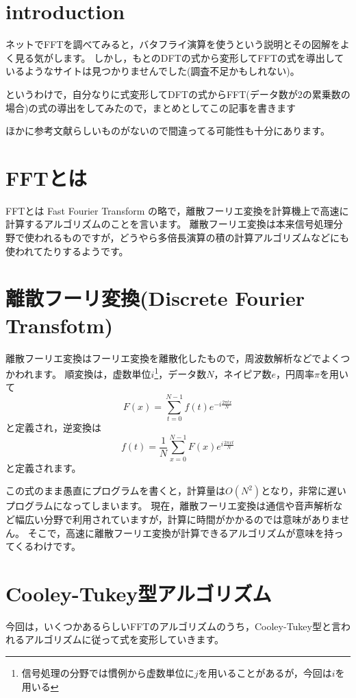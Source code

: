 \documentclass[uplatex, 11pt, a4j, dvipdfmx]{jsarticle}
\begin{document}
\section{introduction}
    ネットでFFTを調べてみると，バタフライ演算を使うという説明とその図解をよく見る気がします。
    しかし，もとのDFTの式から変形してFFTの式を導出しているようなサイトは見つかりませんでした(調査不足かもしれない)。

    というわけで，自分なりに式変形してDFTの式からFFT(データ数が2の累乗数の場合)の式の導出をしてみたので，まとめとしてこの記事を書きます

    ほかに参考文献らしいものがないので間違ってる可能性も十分にあります。

\section{FFTとは}
    FFTとは Fast Fourier Transform の略で，離散フーリエ変換を計算機上で高速に計算するアルゴリズムのことを言います。
    離散フーリエ変換は本来信号処理分野で使われるものですが，どうやら多倍長演算の積の計算アルゴリズムなどにも使われてたりするようです。

\section{離散フーリ変換(Discrete Fourier Transfotm)}
    離散フーリエ変換はフーリエ変換を離散化したもので，周波数解析などでよくつかわれます。
    順変換は，虚数単位$i$\footnote{信号処理の分野では慣例から虚数単位に$j$を用いることがあるが，今回は$i$を用いる}，データ数$N$，ネイピア数$e$，円周率$\pi$を用いて
    \begin{equation}
        F(x) = \sum_{t=0}^{N-1} f(t) e^{-i \frac{2 \pi tx}{N}} \label{eq:dft}
    \end{equation}
    と定義され，逆変換は
    \begin{equation}
        f(t) = \frac{1}{N} \sum_{x=0}^{N-1} F(x) e^{i \frac{2 \pi xt}{N}} \label{eq:idft}
    \end{equation}
    と定義されます。

    この式のまま愚直にプログラムを書くと，計算量は$O(N^2)$となり，非常に遅いプログラムになってしまいます。
    現在，離散フーリエ変換は通信や音声解析など幅広い分野で利用されていますが，計算に時間がかかるのでは意味がありません。
    そこで，高速に離散フーリエ変換が計算できるアルゴリズムが意味を持ってくるわけです。

\section{Cooley-Tukey型アルゴリズム}
    今回は，いくつかあるらしいFFTのアルゴリズムのうち，Cooley-Tukey型と言われるアルゴリズムに従って式を変形していきます。
\end{document}
